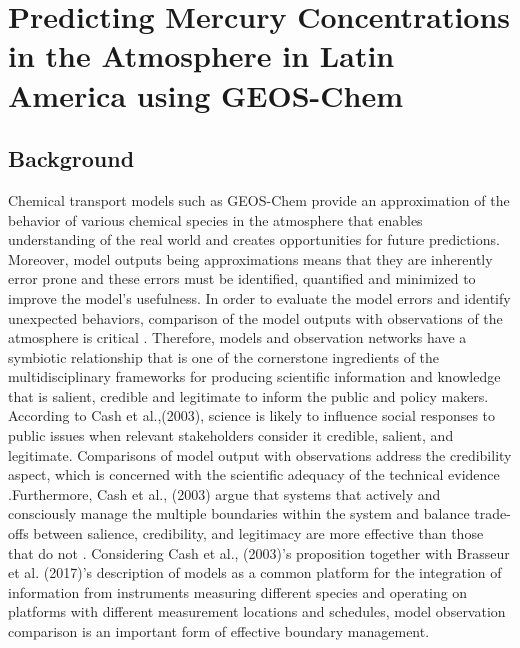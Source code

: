 \chapter{Predicting Mercury Concentrations in the Atmosphere in Latin America using GEOS-Chem }
\section{Background}
\begin{flushleft}

Chemical transport models such as GEOS-Chem provide an approximation of the behavior of various chemical species in the atmosphere that enables understanding of the real world and creates opportunities for future predictions. Moreover, model outputs being approximations means that they are inherently error prone and these errors must be identified, quantified and minimized to improve the model's usefulness. In order to evaluate the model errors and identify unexpected behaviors, comparison of the model outputs with observations of the atmosphere is critical \cite{brasseur_modeling_2017}. Therefore, models and observation networks have a symbiotic relationship that is one of the cornerstone ingredients of the multidisciplinary frameworks for producing scientific information and knowledge that is salient, credible and legitimate to inform the public and policy makers. According to Cash et al.,(2003), science is likely to influence social responses to public issues when relevant stakeholders consider it credible, salient, and legitimate\cite{cash_salience_2003}. Comparisons of model output with observations address the credibility aspect, which is concerned with the scientific adequacy of the technical evidence \cite{cash_salience_2003}.Furthermore, Cash et al., (2003) argue that systems that actively and consciously manage the multiple boundaries within the system and balance trade-offs between salience, credibility, and legitimacy are more effective than those that do not \cite{cash_salience_2003}. Considering Cash et al., (2003)'s proposition together with Brasseur et al. (2017)'s description of models as a common platform for the integration of information from instruments measuring different species and operating  on platforms with different measurement locations and schedules, model observation comparison is an important form of effective boundary management. 
\end{flushleft}

